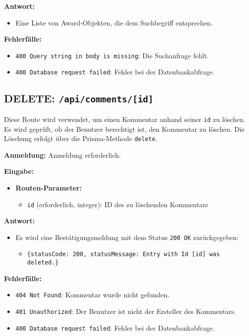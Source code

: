 \documentclass[a4paper,12pt]{article}
\begin{document}
\textbf{Antwort:}
\begin{itemize}
    \item Eine Liste von Award-Objekten, die dem Suchbegriff entsprechen.
\end{itemize}

\textbf{Fehlerfälle:}
\begin{itemize}
    \item \texttt{400 Query string in body is missing}: Die Suchanfrage fehlt.
    \item \texttt{400 Database request failed}: Fehler bei der Datenbankabfrage.
\end{itemize}

\newpage
\subsection{DELETE: \texttt{/api/comments/[id]}}

Diese Route wird verwendet, um einen Kommentar anhand seiner \texttt{id} zu
löschen. Es wird geprüft, ob der Benutzer berechtigt ist, den Kommentar zu
löschen. Die Löschung erfolgt über die Prisma-Methode \texttt{delete}.

\textbf{Anmeldung:} Anmeldung erforderlich.

\textbf{Eingabe:}
\begin{itemize}
    \item \textbf{Routen-Parameter:}
    \begin{itemize}
        \item \texttt{id} (erforderlich, integer):
            ID des zu löschenden Kommentars
    \end{itemize}
\end{itemize}

\textbf{Antwort:}
\begin{itemize}
    \item Es wird eine Bestätigungsmeldung mit dem Status
        \texttt{200 OK} zurückgegeben:
    \begin{itemize}
        \item \texttt{\{statusCode: 200,
            statusMessage: Entry with Id [id] was deleted.\}}
    \end{itemize}
\end{itemize}

\textbf{Fehlerfälle:}
\begin{itemize}
    \item \texttt{404 Not Found}:
        Kommentar wurde nicht gefunden.
    \item \texttt{401 Unauthorized}:
        Der Benutzer ist nicht der Ersteller des Kommentars.
    \item \texttt{400 Database request failed}:
        Fehler bei der Datenbankabfrage.
\end{itemize}
\end{document}
